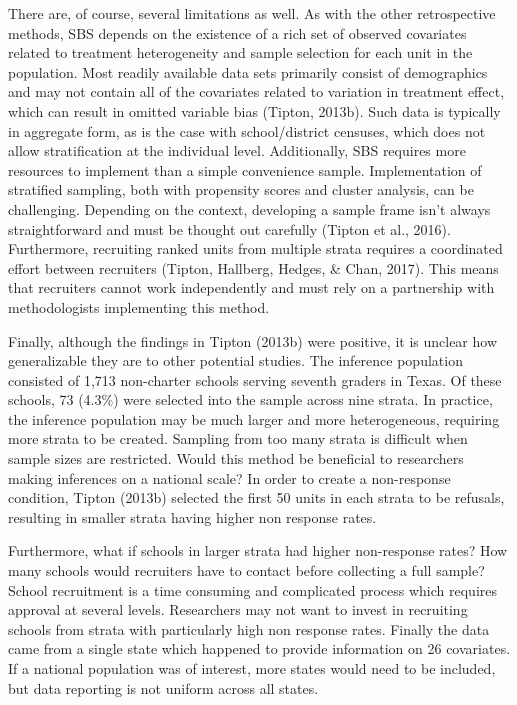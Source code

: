 \documentclass[man,floatsintext]{apa6}
\theoremstyle{definition}
\theoremstyle{definition}
\theoremstyle{definition}
\theoremstyle{remark}
\begin{document}
There are, of course, several limitations as well. As with the other
retrospective methods, SBS depends on the existence of a rich set of
observed covariates related to treatment heterogeneity and sample
selection for each unit in the population. Most readily available data
sets primarily consist of demographics and may not contain all of the
covariates related to variation in treatment effect, which can result in
omitted variable bias (Tipton, 2013b). Such data is typically in
aggregate form, as is the case with school/district censuses, which does
not allow stratification at the individual level. Additionally, SBS
requires more resources to implement than a simple convenience sample.
Implementation of stratified sampling, both with propensity scores and
cluster analysis, can be challenging. Depending on the context,
developing a sample frame isn't always straightforward and must be
thought out carefully (Tipton et al., 2016). Furthermore, recruiting
ranked units from multiple strata requires a coordinated effort between
recruiters (Tipton, Hallberg, Hedges, \& Chan, 2017). This means that
recruiters cannot work independently and must rely on a partnership with
methodologists implementing this method.

Finally, although the findings in Tipton (2013b) were positive, it is
unclear how generalizable they are to other potential studies. The
inference population consisted of 1,713 non-charter schools serving
seventh graders in Texas. Of these schools, 73 (4.3\%) were selected
into the sample across nine strata. In practice, the inference
population may be much larger and more heterogeneous, requiring more
strata to be created. Sampling from too many strata is difficult when
sample sizes are restricted. Would this method be beneficial to
researchers making inferences on a national scale? In order to create a
non-response condition, Tipton (2013b) selected the first 50 units in
each strata to be refusals, resulting in smaller strata having higher
non response rates.

Furthermore, what if schools in larger strata had higher non-response
rates? How many schools would recruiters have to contact before
collecting a full sample? School recruitment is a time consuming and
complicated process which requires approval at several levels.
Researchers may not want to invest in recruiting schools from strata
with particularly high non response rates. Finally the data came from a
single state which happened to provide information on 26 covariates. If
a national population was of interest, more states would need to be
included, but data reporting is not uniform across all states.
\end{document}
